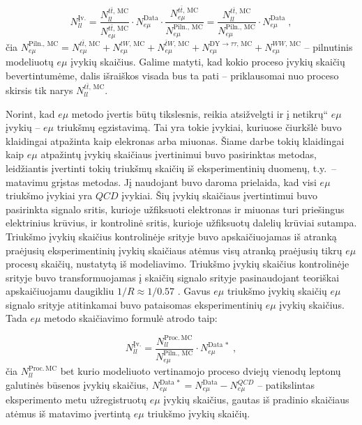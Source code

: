 \documentclass[a4paper, 12pt]{article}
\newcommand{\tbarW}{\bar{t}W}
\newcommand{\ttbar}{t\bar{t}}
\newcommand{\emu}{e\mu}
\newcommand{\DYtau}{\mathrm{DY} \! \rightarrow \! \tau\tau}
\newcommand{\ltq}[1]{{\quotedblbase{}#1\textquotedblleft{}}}
\newcommand{\QCD}{QC\! D}
\newlength\q
\begin{document}
\begin{equation}
	N_{ll}^{\mathrm{Įv.}} =
	\frac{ N_{ll}^{\ttbar, \, \mathrm{MC}} }{ N_{\emu}^{\ttbar, \, \mathrm{MC}} }
	\cdot N_{\emu}^{\mathrm{Data}} \cdot
	\frac{N_{\emu}^{\ttbar, \, \mathrm{MC}}}{N_{\emu}^{\mathrm{Piln., \, MC}}}
	=
	\frac{ N_{ll}^{\ttbar, \, \mathrm{MC}} }{ N_{\emu}^{\mathrm{Piln., \, MC}} }
	\cdot N_{\emu}^{\mathrm{Data}} \; ,
	\label{eq:emuProc}
\end{equation}
čia $N_{\emu}^{\mathrm{Piln., \, MC}} = N_{\emu}^{\ttbar, \, \mathrm{MC}} + N_{\emu}^{tW, \, \mathrm{MC}} +
N_{\emu}^{\tbarW, \, \mathrm{MC}} + N_{\emu}^{\DYtau, \, \mathrm{MC}} + N_{\emu}^{WW, \, \mathrm{MC}}$  -- pilnutinis
modeliuotų $\emu$ įvykių skaičius.
Galime matyti, kad kokio proceso įvykių skaičių bevertintumėme, dalis išraiškos visada bus ta pati --  priklausomai nuo
proceso skirsis tik narys $N_{ll}^{\ttbar, \, \mathrm{MC}}$.

Norint, kad $\emu$ metodo įvertis būtų tikslesnis, reikia atsižvelgti ir į \ltq{netikrų} $\emu$ įvykių -- $\emu$ triukšmų
egzistavimą.
Tai yra tokie įvykiai, kuriuose čiurkšlė buvo klaidingai atpažinta kaip elekronas arba miuonas.
Šiame darbe tokių klaidingai kaip $\emu$ atpažintų įvykių skaičiaus įvertinimui buvo pasirinktas metodas, leidžiantis
įvertinti tokių triukšmų skaičių iš eksperimentinių duomenų, t.y.\ -- matavimu grįstas metodas.
Jį naudojant buvo daroma prielaida, kad visi $\emu$ triukšmo įvykiai yra $QCD$ įvykiai.
Šių įvykių skaičiaus įvertintimui buvo pasirinkta signalo sritis, kurioje užfiksuoti elektronas ir miuonas turi
priešingus elektrinius krūvius, ir kontrolinė sritis, kurioje užfiksuotų dalelių krūviai sutampa.
Triukšmo įvykių skaičius kontrolinėje srityje buvo apskaičiuojamas iš atranką praėjusių eksperimentinių įvykių skaičiaus
atėmus visų atranką praėjusių tikrų $\emu$ procesų skaičių, nustatytą iš modeliavimo.
Triukšmo įvykių skaičius kontrolinėje srityje buvo transformuojamas į skaičių signalo srityje pasinaudojant teoriškai
apskaičiuojamu daugikliu $1/R\approx 1/0.57$ \cite{AN2013}.
Gavus $\emu$ triukšmo įvykių skaičių $\emu$ signalo srityje atitinkamai buvo pataisomas eksperimentinių $\emu$
įvykių skaičius.
Tada $\emu$ metodo skaičiavimo formulė atrodo taip:

\begin{equation}
	N_{ll}^{\mathrm{Įv.}} = \frac{ N_{ll}^{\mathrm{Proc. \, MC}} }{ N_{\emu}^{\mathrm{Piln., \, MC}} }
	\cdot N_{\emu}^{\mathrm{Data} \, *} \; ,
	\label{eq:emuFinal}
\end{equation}
čia $N_{ll}^{\mathrm{Proc. \, MC}}$ bet kurio modeliuoto vertinamojo proceso dviejų vienodų leptonų galutinės būsenos
įvykių skaičius, $N_{\emu}^{\mathrm{Data} \, *} = N_{\emu}^{\mathrm{Data}} - N_{\emu}^{\QCD}$ --
patikslintas eksperimento metu užregistruotų $\emu$ įvykių skaičius, gautas iš pradinio skaičiaus atėmus iš matavimo
įvertintą $\emu$ triukšmo įvykių skaičių.
\end{document}
